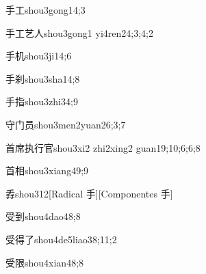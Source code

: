\begin{verbete}{手工}{shou3gong1}{4;3}
\end{verbete}

\begin{verbete}{手工艺人}{shou3gong1 yi4ren2}{4;3;4;2}
\end{verbete}

\begin{verbete}{手机}{shou3ji1}{4;6}
\end{verbete}

\begin{verbete}{手刹}{shou3sha1}{4;8}
\end{verbete}

\begin{verbete}{手指}{shou3zhi3}{4;9}
\end{verbete}

\begin{verbete}{守门员}{shou3men2yuan2}{6;3;7}
\end{verbete}

\begin{verbete}{首席执行官}{shou3xi2 zhi2xing2 guan1}{9;10;6;6;8}
\end{verbete}

\begin{verbete}{首相}{shou3xiang4}{9;9}
\end{verbete}

\begin{verbete}{掱}{shou3}{12}[Radical 手][Componentes 手]
\end{verbete}

\begin{verbete}{受到}{shou4dao4}{8;8}
\end{verbete}

\begin{verbete}{受得了}{shou4de5liao3}{8;11;2}
\end{verbete}

\begin{verbete}{受限}{shou4xian4}{8;8}
\end{verbete}

